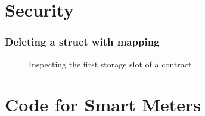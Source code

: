 \begin{appendices}
\chapter{Security}

\subsection{Deleting a struct with mapping} \label{apx:security:mapping}
\begin{figure}[H]
    \centering
    
    \caption{Inspecting the first storage slot of a contract}
    \label{fig:storage}
\end{figure}
\chapter{Code for Smart Meters}



\end{appendices}